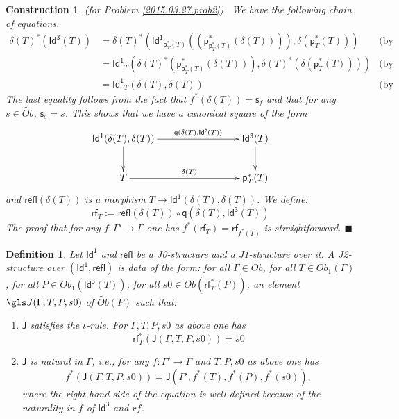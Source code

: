 \documentclass[12pt]{article}
\numberwithin{equation}{section}
\newenvironment{eq}{\begin{equation}}{\end{equation}}
\newtheorem{definition}[proposition]{Definition}
\newtheorem{construction0}[proposition]{Construction}
\newenvironment{construction}[1]{\begin{construction0}(for Problem \ref{#1})\ }{$\blacksquare$ \end{construction0}}
\newcommand{\by}[1]{\text{(by #1)}}
\newcommand{\llabel}[1]{\label{#1}}
\newcommand{\sr}{\rightarrow}
\newcommand{\wt}{\widetilde}
\newcommand{\p}{\mathsf{p}}
\newcommand{\q}{\mathsf{q}}
\newcommand{\s}{\mathsf{s}}     %
\newcommand{\Id}{\mathsf{Id^1}} %
\newcommand{\Idx}{\mathsf{Id^3}} %
\newcommand{\refl}{\mathsf{refl}}
\newcommand{\J}{\mathsf{J}}
\newcommand{\rf}{\mathsf{rf}}
\begin{document}
\begin{construction}{2015.03.27.prob2}
\llabel{2015.03.27.constr2}\rm We have the following chain of equations.
%
\begin{align*}
  \delta(T)^*(\Idx(T)) & = \delta(T)^*(\Id_{\p_T^*(T)}((\p_{\p_T^*(T)}^*(\delta(T)))),\delta(\p_T^*(T)))  & \by{...}\\
    & = \Id_T(\delta(T)^*(\p_{\p_T^*(T)}^*(\delta(T))),\delta(T)^*(\delta(\p_T^*(T)))) & \by{...}\\
    & = \Id_T(\delta(T),\delta(T)) & \by{...}
\end{align*}
%
The last equality follows from the fact that $f^*(\delta(T))=\s_f$ and that for
any $s\in\wt{Ob}$, $\s_s=s$.  This shows that we have a canonical square of the
form
%
\begin{eq}
\llabel{2015.03.31.eq3}
\begin{xy}
          \xymatrix@C=7pc{ \Id(\delta(T),\delta(T))
            \ar[r]^-{\q(\delta(T),\Idx(T))} \ar[d] & \Idx(T) \ar[d]\\ T
            \ar[r]^{\delta(T)} & \p_T^*(T) }
       \end{xy}
\end{eq}%
%
and $\refl(\delta(T))$ is a morphism $T\sr \Id(\delta(T),\delta(T))$. We define:
%
\begin{eq}
\llabel{2015.04.02.eq1} \rf_T:=\refl(\delta(T))\circ \q(\delta(T),\Idx(T))
\end{eq}%
%
The proof that for any $f:\Gamma'\sr \Gamma$ one has $f^*(\rf_T)=\rf_{f^*(T)}$ is
straightforward.
\end{construction}
%
\begin{definition}
\llabel{2015.03.27.def3} Let $\Id$ and $\refl$ be a J0-structure and a
J1-structure over it. A J2-structure over $(\Id,\refl)$ is data of the form: for
all $\Gamma\in Ob$, for all $T\in Ob_1(\Gamma)$, for all $P\in Ob_1(\Idx(T))$,
for all $s0\in \wt{Ob}(\rf_T^*(P))$, an element $\gls J(\Gamma,T,P,s0)$ of
$\wt{Ob}(P)$ such that:
%
\begin{enumerate}
\item $\J$ satisfies the $\iota$-rule. For $\Gamma, T, P, s0$ as above one has
%
$$\rf_T^*(\J(\Gamma,T,P,s0))=s0$$
%
\item $\J$ is natural in $\Gamma$, i.e., for any $f:\Gamma'\sr \Gamma$ and
  $T,P,s0$ as above one has
%
$$f^*(\J(\Gamma,T,P,s0))=\J(\Gamma',f^*(T),f^*(P),f^*(s0)),$$
%
where the right hand side of the equation is well-defined because of the
naturality in $f$ of $\Idx$ and $rf$.
\end{enumerate}
\end{definition}
\end{document}

